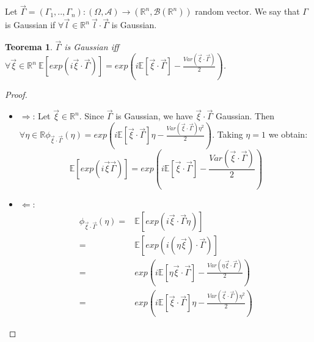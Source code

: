 \documentclass[11pt,a4paper]{article}
\newtheorem{theorem}{Teorema}
\theoremstyle{definition}
\theoremstyle{remark}
\begin{document}
Let $\vec{\Gamma} = (\Gamma_1,..,\Gamma_n): (\Omega,\mathcal{A}) \to (\mathbb{R}^n, \mathcal{B}(\mathbb{R}^n))$ random vector.
We say that $\Gamma$ is Gaussian if $\forall \vec{l} \in \mathbb{R}^n \ \vec{l} \cdot \vec{\Gamma}$ is Gaussian.

\begin{theorem}

	$\vec{\Gamma}$ is Gaussian iff 
	$\forall \vec{\xi} \in \mathbb{R}^n \ \mathbb{E}[exp(i \vec{\xi} \cdot \vec{\Gamma})] = 
	exp(i \mathbb{E}[\vec{\xi}\cdot \vec{\Gamma}] - \frac{Var(\vec{\xi} \cdot \vec{\Gamma})}{2})$.

\end{theorem}


\begin{proof}

	\begin{itemize}
		\item	$\Rightarrow$: 
			Let $\vec{\xi} \in \mathbb{R}^n$. Since $\vec{\Gamma}$ is Gaussian, we have $\vec{\xi} \cdot \vec{\Gamma}$ Gaussian.
			Then $\forall \eta \in \mathbb{R} \phi_{\vec{\xi} \cdot \vec{\Gamma}}(\eta) = 
			exp(i \mathbb{E}[\vec{\xi} \cdot \vec{\Gamma}] \eta - \frac{Var(\vec{\xi} \cdot \vec{\Gamma}) \eta^2}{2})$.
			Taking $\eta = 1$ we obtain:
			\[
				\mathbb{E}[exp(i \vec{\xi} \vec{\Gamma})] = 
				exp(i \mathbb{E}[\vec{\xi} \cdot \vec{\Gamma}] - \frac{Var(\vec{\xi} \cdot \vec{\Gamma})}{2})
			\]
		\item	$\Leftarrow$:
			\begin{align*}
				\phi_{\vec{\xi} \cdot \vec{\Gamma}}(\eta) =& \mathbb{E}[exp(i \vec{\xi} \cdot \vec{\Gamma} \eta)] \\
				=& \mathbb{E}[exp(i (\eta \vec{\xi}) \cdot \vec{\Gamma})] \\
				=& exp(i \mathbb{E}[\eta \vec{\xi} \cdot \vec{\Gamma}] - \frac{Var(\eta \vec{\xi} \cdot \vec{\Gamma})}{2}) \\
				=& exp(i \mathbb{E}[\vec{\xi} \cdot \vec{\Gamma}] \eta - \frac{Var(\vec{\xi} \cdot \vec{\Gamma}) \eta^2}{2})
			\end{align*}

	\end{itemize}

\end{proof}
\end{document}
